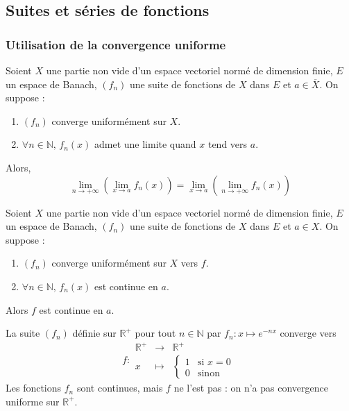 



	\subsection{Suites et séries de fonctions}

	\subsubsection{Utilisation de la convergence uniforme}


	\begin{theorem}
		Soient $X$ une partie non vide d'un espace vectoriel normé de dimension finie, $E$ un espace de Banach, $(f_n)$ une suite de fonctions de $X$ dans $E$ et $a \in \overline{X}$. On suppose :
		\begin{enumerate}[label=(\roman*)]
			\item $(f_n)$ converge uniformément sur $X$.
			\item $\forall n \in \mathbb{N}, \, f_n(x)$ admet une limite quand $x$ tend vers $a$.
		\end{enumerate}
		Alors,
		\[ \lim_{n \rightarrow +\infty} \left( \lim_{x \rightarrow a} f_n(x) \right) = \lim_{x \rightarrow a} \left( \lim_{n \rightarrow +\infty} f_n(x) \right) \]
	\end{theorem}

	\begin{theorem}
		Soient $X$ une partie non vide d'un espace vectoriel normé de dimension finie, $E$ un espace de Banach, $(f_n)$ une suite de fonctions de $X$ dans $E$ et $a \in X$. On suppose :
		\begin{enumerate}[label=(\roman*)]
			\item $(f_n)$ converge uniformément sur $X$ vers $f$.
			\item $\forall n \in \mathbb{N}, \, f_n(x)$ est continue en $a$.
		\end{enumerate}
		Alors $f$ est continue en $a$.
	\end{theorem}

	\begin{example}
		La suite $(f_n)$ définie sur $\mathbb{R}^+$ pour tout $n \in \mathbb{N}$ par $f_n : x \mapsto e^{-nx}$ converge vers
		\[
			f :
			\begin{array}{ccc}
				\mathbb{R}^+ &\rightarrow& \mathbb{R}^+ \\
				x &\mapsto& \begin{cases}
					1 &\text{si } x = 0 \\
					0 &\text{sinon}
				\end{cases}
			\end{array}
		\]
		Les fonctions $f_n$ sont continues, mais $f$ ne l'est pas : on n'a pas convergence uniforme sur $\mathbb{R}^+$.
	\end{example}


